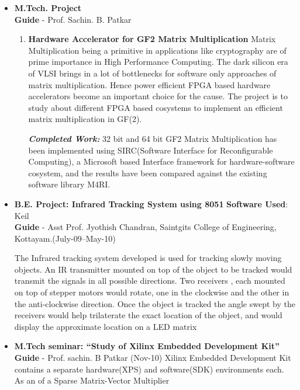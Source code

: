 \documentclass[a4paper,10pt]{article}
\begin{document}
 \begin{itemize}

\setlength{\itemsep}{1pt}
   \item \textbf{{M.Tech. Project}}\\
        {\textbf{Guide} - Prof. Sachin. B. Patkar}
\begin{enumerate}
 
 \item \textbf{Hardware Accelerator for GF2 Matrix Multiplication }
	Matrix Multiplication being a primitive in applications like cryptography are of prime importance in High Performance Computing. 
	The dark silicon era of VLSI brings in a lot of bottlenecks for software only approaches of matrix multiplication. Hence power efficient
	FPGA based hardware accelerators become an important choice for the cause. The project is to study about different FPGA based cosystems to implement
	an efficient matrix multiplication in GF(2). 
	

 \textbf{\textit{Completed Work:}} 
   32 bit and 64 bit GF2 Matrix Multiplication has been implemented using SIRC(Software Interface for Reconfigurable Computing), a Microsoft based Interface framework
   for hardware-software cosystem, and the results have been compared against the existing software library M4RI. 



\end{enumerate}



  \item \textbf{{B.E. Project: Infrared Tracking System using 8051}}  \qquad\qquad\qquad\qquad\qquad\quad \textbf{Software Used}: Keil\\
        {\textbf{Guide} - Asst Prof. Jyothish Chandran, Saintgits College of Engineering, Kottayam.\qquad\qquad\qquad\quad\qquad\qquad\qquad\quad\qquad\qquad\qquad\quad(July-09--May-10)} 
                                                         
	The Infrared tracking system developed is used for tracking slowly moving objects. An IR transmitter mounted on top of the 
	object to be tracked would transmit the signals in all possible directions. Two receivers , each mounted on top of stepper motors
	would rotate, one in the clockwise and the other in the anti-clockwise direction. Once the object is tracked the angle swept by
	the receivers would help trilaterate the exact location of the object, and would display the approximate location  on a LED matrix

  \item \textbf{{M.Tech seminar: ``Study of Xilinx Embedded Development Kit''}}\\
	{\textbf{Guide} - Prof. sachin. B Patkar \qquad\qquad\qquad\quad\qquad\qquad\qquad\quad\qquad\qquad\qquad\qquad\qquad\qquad\quad
	(Nov-10)}
	Xilinx Embedded Development Kit contains a separate hardware(XPS) and software(SDK) environments each. As an  of a Sparse Matrix-Vector Multiplier

 \end{itemize}
\end{document}

